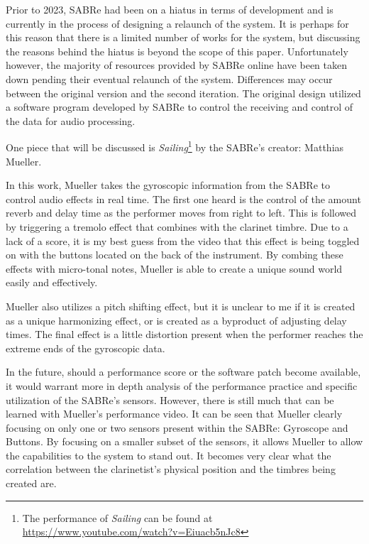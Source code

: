 Prior to 2023, SABRe had been on a hiatus in terms of development and is currently in the process of designing a relaunch of the system. It is perhaps for this reason that there is a limited number of works for the system, but discussing the reasons behind the hiatus is beyond the scope of this paper. Unfortunately however, the majority of resources provided by SABRe online have been taken down pending their eventual relaunch of the system. Differences may occur between the original version and the second iteration. The original design utilized a software program developed by SABRe to control the receiving and control of the data for audio processing. 


One piece that will be discussed is \textit{Sailing}\footnote{The performance of \textit{Sailing} can be found at \url{https://www.youtube.com/watch?v=Eiuacb5nJc8}} by the SABRe's creator: Matthias Mueller.  

In this work, Mueller takes the gyroscopic information from the SABRe to control audio effects in real time. The first one heard is the control of the amount reverb and delay time as the performer moves from right to left. This is followed by triggering a tremolo effect that combines with the clarinet timbre. Due to a lack of a score, it is my best guess from the video that this effect is being toggled on with the buttons located on the back of the instrument. By combing these effects with micro-tonal notes, Mueller is able to create a unique sound world easily and effectively.

Mueller also utilizes a pitch shifting effect, but it is unclear to me if it is created as a unique harmonizing effect, or is created as a byproduct of adjusting delay times. The final effect is a little distortion present when the performer reaches the extreme ends of the gyroscopic data.

In the future, should a performance score or the software patch become available, it would warrant more in depth analysis of the performance practice and specific utilization of the SABRe's sensors. However, there is still much that can be learned with Mueller's performance video. It can be seen that Mueller clearly focusing on only one or two sensors present within the SABRe: Gyroscope and Buttons. By focusing on a smaller subset of the sensors, it allows Mueller to allow the capabilities to the system to stand out. It becomes very clear what the correlation between the clarinetist's physical position and the timbres being created are.

